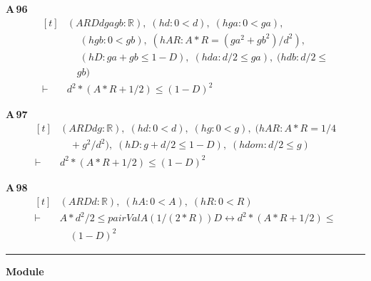 \noindent\textbf{A\,96}\quad{}
{\footnotesize\[ \begin{aligned}[t]
&(\mathit{A} \mathit{R} \mathit{D} \mathit{d} \mathit{ga} \mathit{gb} : \mathbb{R} ),\; (\mathit{hd} : 0 < \mathit{d}),\; (\mathit{hga} : 0 < \mathit{ga}),\\
&\quad \; (\mathit{hgb} : 0 < \mathit{gb}),\; (\mathit{hAR} : \mathit{A} * \mathit{R} = (\mathit{ga} ^{2} + \mathit{gb} ^{2}) / \mathit{d} ^{2}),\\
&\quad \; (\mathit{hD} : \mathit{ga} + \mathit{gb} \leq 1 - \mathit{D}),\; (\mathit{hda} : \mathit{d} / 2 \leq \mathit{ga}),\; (\mathit{hdb} : \mathit{d} / 2 \leq\\
&\quad \mathit{gb})\\
\vdash\;&\mathit{d} ^{2} * (\mathit{A} * \mathit{R} + 1 / 2) \leq (1 - \mathit{D}) ^{2}
\end{aligned} \]}

\noindent\textbf{A\,97}\quad{}
{\footnotesize\[ \begin{aligned}[t]
&(\mathit{A} \mathit{R} \mathit{D} \mathit{d} \mathit{g} : \mathbb{R} ),\; (\mathit{hd} : 0 < \mathit{d}),\; (\mathit{hg} : 0 < \mathit{g}),\; (\mathit{hAR} : \mathit{A} * \mathit{R} = 1 / 4\\
&\quad + \mathit{g} ^{2} / \mathit{d} ^{2}),\; (\mathit{hD} : \mathit{g} + \mathit{d} / 2 \leq 1 - \mathit{D}),\; (\mathit{hdom} : \mathit{d} / 2 \leq \mathit{g})\\
\vdash\;&\mathit{d} ^{2} * (\mathit{A} * \mathit{R} + 1 / 2) \leq (1 - \mathit{D}) ^{2}
\end{aligned} \]}

\noindent\textbf{A\,98}\quad{}
{\footnotesize\[ \begin{aligned}[t]
&(\mathit{A} \mathit{R} \mathit{D} \mathit{d} : \mathbb{R} ),\; (\mathit{hA} : 0 < \mathit{A}),\; (\mathit{hR} : 0 < \mathit{R})\\
\vdash\;&\mathit{A} * \mathit{d} ^{2} / 2 \leq \mathit{pairVal} \mathit{A} (1 / (2 * \mathit{R})) \mathit{D} \leftrightarrow \mathit{d} ^{2} * (\mathit{A} * \mathit{R} + 1 / 2) \leq\\
&\quad (1 - \mathit{D}) ^{2}
\end{aligned} \]}

\vspace{4pt}\noindent\rule{\columnwidth}{0.4pt}\par\vspace{2pt}
\noindent\textbf{Module }\par\vspace{3pt}


